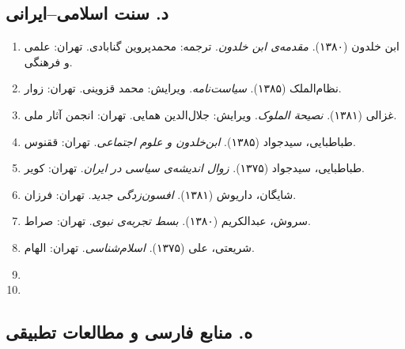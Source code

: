 \subsection*{د. سنت اسلامی–ایرانی}

\begin{enumerate}[leftmargin=2em, label=\arabic*., resume]

\item ابن خلدون (۱۳۸۰). \textit{مقدمه‌ی ابن خلدون}. ترجمه: محمدپروین گنابادی. تهران: علمی و فرهنگی.

\item نظام‌الملک (۱۳۸۵). \textit{سیاست‌نامه}. ویرایش: محمد قزوینی. تهران: زوار.

\item غزالی (۱۳۸۱). \textit{نصیحة الملوک}. ویرایش: جلال‌الدین همایی. تهران: انجمن آثار ملی.

\item طباطبایی، سیدجواد (۱۳۸۵). \textit{ابن‌خلدون و علوم اجتماعی}. تهران: ققنوس.

\item طباطبایی، سیدجواد (۱۳۷۵). \textit{زوال اندیشه‌ی سیاسی در ایران}. تهران: کویر.

\item شایگان، داریوش (۱۳۸۱). \textit{افسون‌زدگی جدید}. تهران: فرزان.

\item سروش، عبدالکریم (۱۳۸۰). \textit{بسط تجربه‌ی نبوی}. تهران: صراط.

\item شریعتی، علی (۱۳۷۵). \textit{اسلام‌شناسی}. تهران: الهام.

\item {}
\item {}

\end{enumerate}

\subsection*{ه. منابع فارسی و مطالعات تطبیقی}

